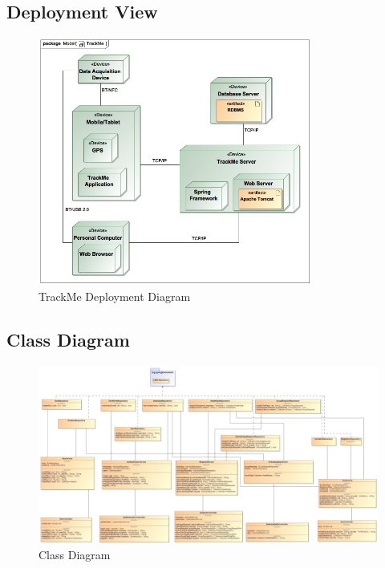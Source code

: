 \documentclass[a4paper]{article}
\begin{document}
\subsection{Deployment View}
\begin{figure}[!htpb]
    \centering
    \includegraphics[width=90mm,keepaspectratio]{images/UML/deployment_TrackMe.jpg}
    \caption{TrackMe Deployment Diagram}
    \label{fig:deployment_trackme}
\end{figure}    

\subsection{Class Diagram}
\begin{figure}[!htpb]
    \centering
    \advance\leftskip-3.3cm
    \includegraphics[width=1.6\textwidth,keepaspectratio]{DD/images/UML/ClassDiagram.jpg}
    \caption{Class Diagram}
    \label{fig:class_diagram}
\end{figure} 
\end{document}
